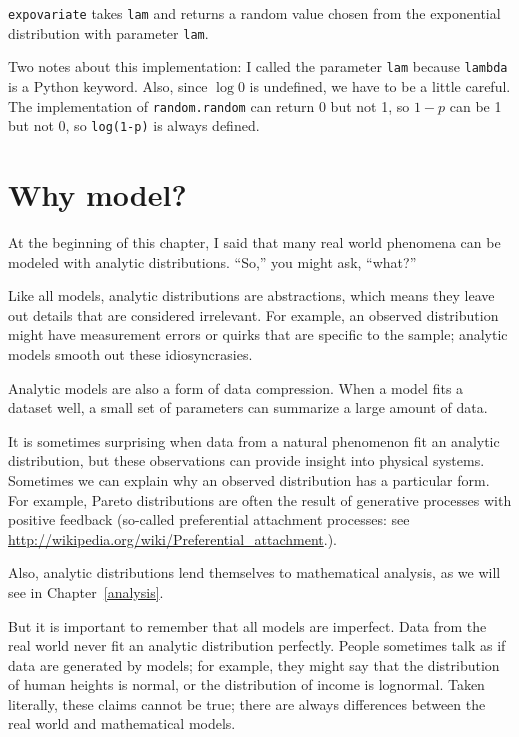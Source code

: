 \documentclass[12pt]{book}
\begin{document}
{\tt expovariate} takes {\tt lam} and returns a random value chosen
from the exponential distribution with parameter {\tt lam}.

Two notes about this implementation:
I called the parameter \verb"lam" because \verb"lambda" is a Python
keyword.  Also, since $\log 0$ is undefined, we have to
be a little careful.  The implementation of {\tt random.random}
can return 0 but not 1, so $1 - p$ can be 1 but not 0, so
{\tt log(1-p)} is always defined.  


\section{Why model?}

At the beginning of this chapter, I said that many real world phenomena
can be modeled with analytic distributions.  ``So,'' you might ask,
``what?''  

Like all models, analytic distributions are abstractions, which
means they leave out details that are considered irrelevant.
For example, an observed distribution might have measurement errors
or quirks that are specific to the sample; analytic models smooth
out these idiosyncrasies.

Analytic models are also a form of data compression.  When a model
fits a dataset well, a small set of parameters can summarize a
large amount of data.

It is sometimes surprising when data from a natural phenomenon fit an
analytic distribution, but these observations can provide insight
into physical systems.  Sometimes we can explain why an observed
distribution has a particular form.  For example, Pareto distributions
are often the result of generative processes with positive feedback
(so-called preferential attachment processes: see
\url{http://wikipedia.org/wiki/Preferential_attachment}.).

Also, analytic distributions lend themselves to mathematical
analysis, as we will see in Chapter~\ref{analysis}.

But it is important to remember that all models are imperfect.
Data from the real world never fit an analytic distribution perfectly.
People sometimes talk as if data are generated by models; for example,
they might say that the distribution of human heights is normal,
or the distribution of income is lognormal.  Taken literally, these
claims cannot be true; there are always differences between the
real world and mathematical models.
\end{document}
